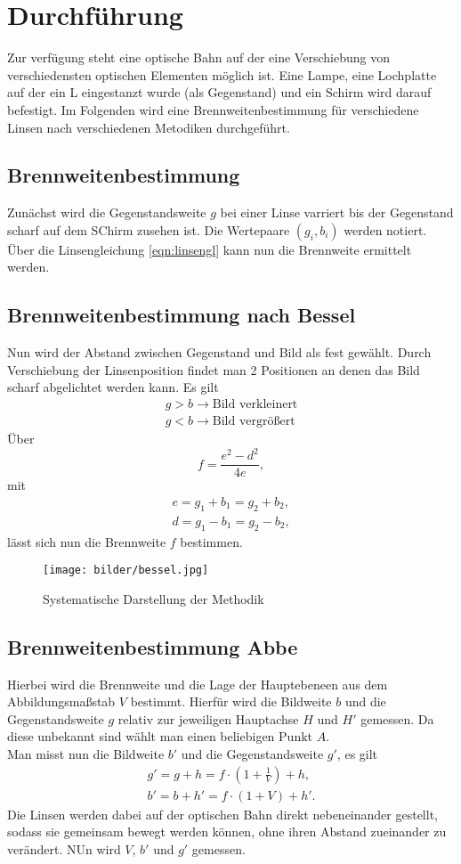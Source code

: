 \section{Durchführung}
Zur verfügung steht eine optische Bahn auf der eine Verschiebung von verschiedensten optischen Elementen möglich ist.
Eine Lampe, eine Lochplatte auf der ein L eingestanzt wurde (als Gegenstand) und ein Schirm wird darauf befestigt.
Im Folgenden wird eine Brennweitenbestimmung für verschiedene Linsen nach verschiedenen Metodiken durchgeführt.

\subsection{Brennweitenbestimmung}
Zunächst wird die Gegenstandsweite $g$ bei einer Linse varriert bis der Gegenstand scharf auf dem SChirm zusehen ist.
Die Wertepaare $(g_i,b_i)$ werden notiert.\\
Über die Linsengleichung \ref{eqn:linsengl} kann nun die Brennweite ermittelt werden.
\subsection{Brennweitenbestimmung nach Bessel}
Nun wird der Abstand zwischen Gegenstand und Bild als fest gewählt.
Durch Verschiebung der Linsenposition findet man 2 Positionen an denen das Bild scharf abgelichtet werden kann.
Es gilt
\begin{align*}
    g > b \rightarrow \text{Bild verkleinert}\\
    g < b  \rightarrow \text{Bild vergrößert}
\end{align*}
Über
\begin{equation}
    f=\frac{e^2-d^2}{4e},
\end{equation}
mit
\begin{align}
    e=g_1+b_1=g_2+b_2,\\
    d=g_1-b_1=g_2-b_2,
\end{align}
lässt sich nun die Brennweite $f$ bestimmen.
\begin{figure}
    \centering
    \texttt{[image: bilder/bessel.jpg]}
    \caption{Systematische Darstellung der Methodik\cite[4]{anleitung}}
\end{figure}
\label{sec:Durchfuehrung}
\subsection{Brennweitenbestimmung Abbe}
Hierbei wird die Brennweite und die Lage der Hauptebeneen aus dem Abbildungsmaßstab $V$ bestimmt.
Hierfür wird die Bildweite $b$ und die Gegenstandsweite $g$ relativ zur jeweiligen Hauptachse $H$ und $H'$ gemessen.
Da diese unbekannt sind wählt man einen beliebigen Punkt $A$.\\
Man misst nun die Bildweite $b'$ und die Gegenstandsweite $g'$, es gilt
\begin{align}
    g'=g+h=f \cdot \left(1+\frac{1}{V}\right)+h,\\
    b'=b+h'=f \cdot \left(1+V\right)+h'.
\end{align}
Die Linsen werden dabei auf der optischen Bahn direkt nebeneinander gestellt, sodass sie gemeinsam bewegt werden können,
ohne ihren Abstand zueinander zu verändert. NUn wird $V$, $b'$ und $g'$ gemessen.
